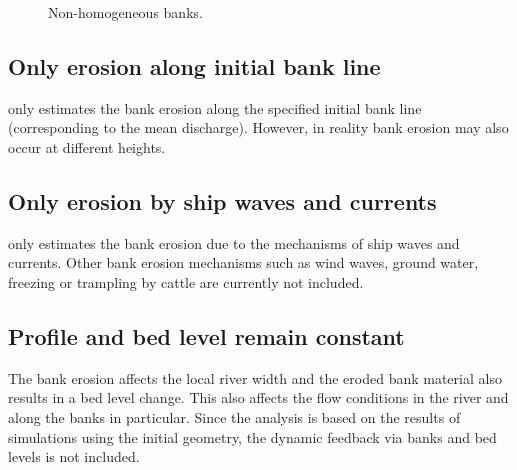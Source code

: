 \begin{figure}
\center
\center
\resizebox{13cm}{!}{
   
}
\caption{Non-homogeneous banks.}
\label{Fig4.8}
\end{figure}

\subsection{Only erosion along initial bank line}

\dfastbe only estimates the bank erosion along the specified initial bank line (corresponding to the mean discharge).
However, in reality bank erosion may also occur at different heights.

\subsection{Only erosion by ship waves and currents}

\dfastbe only estimates the bank erosion due to the mechanisms of ship waves and currents.
Other bank erosion mechanisms such as wind waves, ground water, freezing or trampling by cattle are currently not included.

\subsection{Profile and bed level remain constant}

The bank erosion affects the local river width and the eroded bank material also results in a bed level change.
This also affects the flow conditions in the river and along the banks in particular.
Since the analysis is based on the results of \dflowfm simulations using the initial geometry, the dynamic feedback via banks and bed levels is not included.
